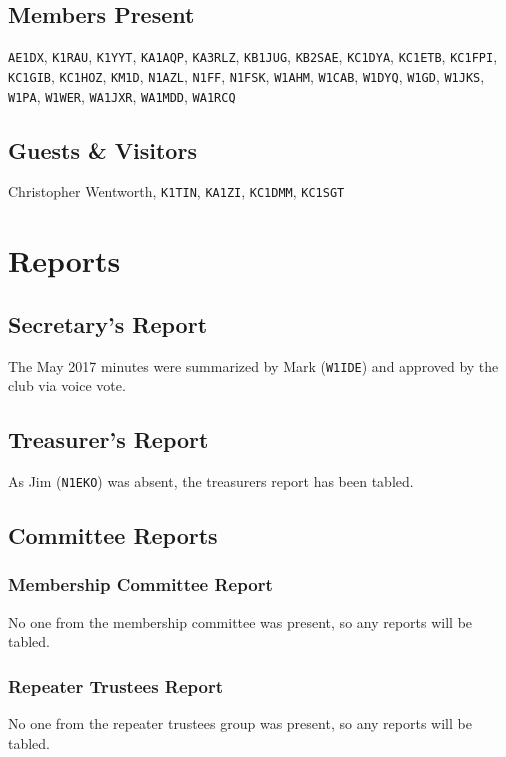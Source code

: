 \documentclass[10pt,letterpaper]{article}
\begin{document}
\subsection{Members Present}
\texttt{AE1DX},
\texttt{K1RAU},
\texttt{K1YYT},
\texttt{KA1AQP},
\texttt{KA3RLZ},
\texttt{KB1JUG},
\texttt{KB2SAE},
\texttt{KC1DYA},
\texttt{KC1ETB},
\texttt{KC1FPI},
\texttt{KC1GIB},
\texttt{KC1HOZ},
\texttt{KM1D},
\texttt{N1AZL},
\texttt{N1FF},
\texttt{N1FSK},
\texttt{W1AHM},
\texttt{W1CAB},
\texttt{W1DYQ},
\texttt{W1GD},
\texttt{W1JKS},
\texttt{W1PA},
\texttt{W1WER},
\texttt{WA1JXR},
\texttt{WA1MDD},
\texttt{WA1RCQ}

\subsection{Guests \& Visitors}
Christopher Wentworth,
\texttt{K1TIN},
\texttt{KA1ZI},
\texttt{KC1DMM},
\texttt{KC1SGT}

\noindent

\section{Reports}

\subsection{Secretary's Report}
The May 2017 minutes were summarized by Mark (\texttt{W1IDE}) and approved by the club via voice vote.

\newpage
\subsection{Treasurer's Report}
As Jim (\texttt{N1EKO}) was absent, the treasurers report has been tabled.

\subsection{Committee Reports}

\subsubsection{Membership Committee Report}
No one from the membership committee was present, so any reports will be tabled.

\subsubsection{Repeater Trustees Report}
No one from the repeater trustees group was present, so any reports will be tabled.
\end{document}
